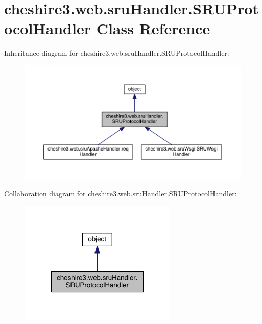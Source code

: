 \hypertarget{classcheshire3_1_1web_1_1sru_handler_1_1_s_r_u_protocol_handler}{\section{cheshire3.\-web.\-sru\-Handler.\-S\-R\-U\-Protocol\-Handler Class Reference}
\label{classcheshire3_1_1web_1_1sru_handler_1_1_s_r_u_protocol_handler}
}


Inheritance diagram for cheshire3.\-web.\-sru\-Handler.\-S\-R\-U\-Protocol\-Handler\-:
\nopagebreak
\begin{figure}[H]
\begin{center}
\leavevmode
\includegraphics[width=350pt]{classcheshire3_1_1web_1_1sru_handler_1_1_s_r_u_protocol_handler__inherit__graph}
\end{center}
\end{figure}


Collaboration diagram for cheshire3.\-web.\-sru\-Handler.\-S\-R\-U\-Protocol\-Handler\-:
\nopagebreak
\begin{figure}[H]
\begin{center}
\leavevmode
\includegraphics[width=214pt]{classcheshire3_1_1web_1_1sru_handler_1_1_s_r_u_protocol_handler__coll__graph}
\end{center}
\end{figure}
